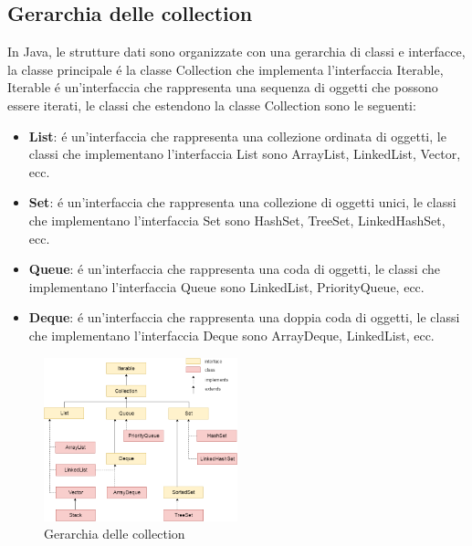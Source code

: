 \documentclass[11pt]{article}
\begin{document}
\subsection{Gerarchia delle collection}
    In Java, le strutture dati sono organizzate con una gerarchia di classi e interfacce,
    la classe principale é la classe Collection che implementa l'interfaccia Iterable, Iterable é un'interfaccia che rappresenta una sequenza di oggetti che possono essere iterati,
    le classi che estendono la classe Collection sono le seguenti:
    \begin{itemize}
        \item \textbf{List}: é un'interfaccia che rappresenta una collezione ordinata di oggetti, le classi che implementano l'interfaccia List sono ArrayList, LinkedList, Vector, ecc.
        \item \textbf{Set}: é un'interfaccia che rappresenta una collezione di oggetti unici, le classi che implementano l'interfaccia Set sono HashSet, TreeSet, LinkedHashSet, ecc.
        \item \textbf{Queue}: é un'interfaccia che rappresenta una coda di oggetti, le classi che implementano l'interfaccia Queue sono LinkedList, PriorityQueue, ecc.
        \item \textbf{Deque}: é un'interfaccia che rappresenta una doppia coda di oggetti, le classi che implementano l'interfaccia Deque sono ArrayDeque, LinkedList, ecc.
        \end{itemize}
    \begin{figure}[H]
        \centering
        \includegraphics[width=0.5\textwidth]{Collection}
        \caption{Gerarchia delle collection}
    \end{figure}
\end{document}
